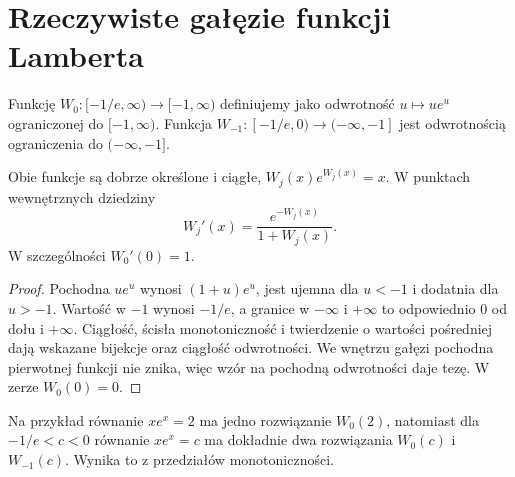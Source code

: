\section{Rzeczywiste gałęzie funkcji Lamberta}
\begin{definicja}
\label{ma1:def:lambert-w}
Funkcję $W_0:[-1/e,\infty)\to[-1,\infty)$
definiujemy jako odwrotność $u\mapsto ue^u$
ograniczonej do $[-1,\infty)$.
Funkcja $W_{-1}:[-1/e,0)\to(-\infty,-1]$
jest odwrotnością ograniczenia do $(-\infty,-1]$.
\end{definicja}
\begin{stwierdzenie}
\label{ma1:prop:lambert-w}
Obie funkcje są dobrze określone i ciągłe,
$W_j(x)e^{W_j(x)}=x$.
W punktach wewnętrznych dziedziny
\[
 W_j'(x)=\frac{e^{-W_j(x)}}{1+W_j(x)}.
\]
W szczególności $W_0'(0)=1$.
\end{stwierdzenie}
\begin{proof}
Pochodna $ue^u$ wynosi $(1+u)e^u$,
jest ujemna dla $u<-1$ i dodatnia dla $u>-1$.
Wartość w $-1$ wynosi $-1/e$,
a granice w $-\infty$ i $+\infty$ to odpowiednio
$0$ od dołu i $+\infty$. Ciągłość, ścisła
monotoniczność i twierdzenie o wartości pośredniej
dają wskazane bijekcje oraz ciągłość odwrotności.
We wnętrzu gałęzi pochodna pierwotnej funkcji
nie znika, więc wzór na pochodną odwrotności
daje tezę. W zerze $W_0(0)=0$.
\end{proof}
Na przykład równanie $xe^x=2$ ma jedno rozwiązanie
$W_0(2)$, natomiast dla $-1/e<c<0$ równanie
$xe^x=c$ ma dokładnie dwa rozwiązania $W_0(c)$
i $W_{-1}(c)$. Wynika to z przedziałów monotoniczności.

